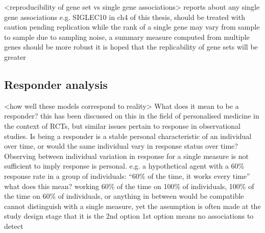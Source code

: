 \begin{outline}
\1 <reproducibility of gene set vs single gene associations> 
    \2 reports about any single gene associations e.g. SIGLEC10 in ch4 of this thesis, should be treated with caution pending replication
    \2 while the rank of a single gene may vary from sample to sample due to sampling noise, a summary measure computed from multiple genes should be more robust
    \2 it is hoped that the replicability of gene sets will be greater

\subsection{Responder analysis}

\1 <how well these models correspond to reality>
    \2 What does it mean to be a responder?
    \2 this has been discussed on this in the field of personalised medicine in the context of RCTs, but similar issues pertain to response in observational studies. \autocite{senn2018StatisticalPitfallsPersonalized}
    \2 Is being a responder is a stable personal characteristic of an individual over time, or would the same individual vary in response status over time?
    \2 Observing between individual variation in response for a single measure is not sufficient to imply response is personal.
    \2 e.g. a hypothetical agent with a 60\% response rate in a group of individuals: \enquote{60\% of the time, it works every time}
    \2 what does this mean? working 60\% of the time on 100\% of individuals, 100\% of the time on 60\% of individuals, or anything in between would be compatible
    \2 cannot distinguish with a single measure, yet the assumption is often made at the study design stage that it is the 2nd option
    \2 1st option means no associations to detect


\end{outline}
